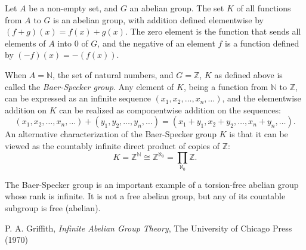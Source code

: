 \documentclass[12pt]{article}
\begin{document}
Let $A$ be a non-empty set, and $G$ an abelian group.  The set $K$
of all functions from $A$ to $G$ is an abelian group, with addition
defined elementwise by $(f+g)(x)=f(x)+g(x)$.  The zero element is
the function that sends all elements of $A$ into $0$ of $G$, and the
negative of an element $f$ is a function defined by
$(-f)(x)=-(f(x))$.

When $A=\mathbb{N}$, the set of natural numbers, and $G=\mathbb{Z}$,
$K$ as defined above is called the \emph{Baer-Specker group}.  Any
element of $K$, being a function from $\mathbb{N}$ to $\mathbb{Z}$,
can be expressed as an infinite sequence $(
x_1,x_2,\ldots,x_n,\ldots)$, and the elementwise addition on $K$ can
be realized as componentwise addition on the sequences: $$(
x_1,x_2,\ldots,x_n,\ldots)+( y_1,y_2,\ldots,y_n,\ldots)=
(x_1+y_1,x_2+y_2,\ldots,x_n+y_n,\ldots).$$ An alternative
characterization of the Baer-Specker group $K$ is that it can be
viewed as the countably infinite direct product of copies of
$\mathbb{Z}$:
$$K=\mathbb{Z}^{\mathbb{N}}\cong\mathbb{Z}^{\aleph_0}= \prod_{\aleph_0}\mathbb{Z}.$$

The Baer-Specker group is an important example of a torsion-free
abelian group whose rank is infinite.  It is not a free abelian
group, but any of its countable subgroup is free (abelian).

\begin{thebibliography}{6}
 P. A. Griffith, {\it Infinite Abelian Group Theory}, The University of Chicago Press (1970)
\end{thebibliography}
\end{document}
